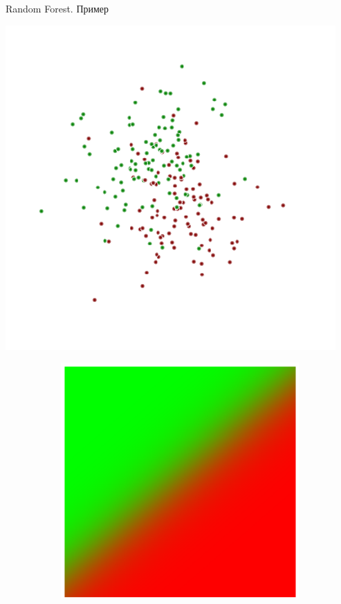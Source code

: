 \documentclass[10pt]{beamer}
\begin{document}
\begin{frame}{Random Forest. Пример}
\begin{center}
    \includegraphics[scale=0.25]{images/rforig.png}
\end{center}
\begin{figure}
    \centering
    \begin{subfigure}[b]{0.3\textwidth}
        \includegraphics[width=\textwidth]{images/rf1.png}

\end{subfigure}
\end{figure}
\end{frame}
\end{document}
